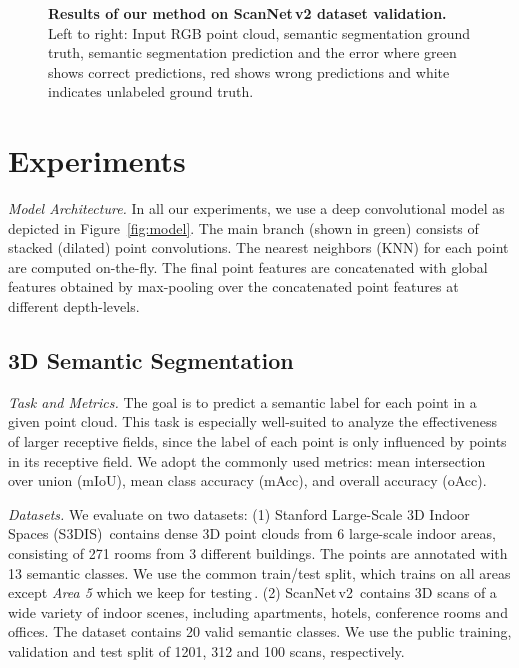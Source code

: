 \documentclass[letterpaper, 10 pt, conference]{ieeeconf}
\newcommand{\reffig}[1]{Figure~\ref{fig:#1}}
\newcommand{\parag}[1]{\vspace{0ex} \textit{#1}}
\begin{document}
\begin{figure*}[htp]
\caption{\textbf{Results of our method on ScanNet\,v2 dataset \cite{Dai17CVPR} validation.} Left to right: Input RGB point cloud, semantic segmentation ground truth, semantic segmentation prediction and the error where green shows correct predictions, red shows wrong predictions and white indicates unlabeled ground truth.}
\label{fig:scannet_quali}
\end{figure*}
 


\section{Experiments}
\label{sec:experiments}

\parag{Model Architecture.}
In all our experiments, we use a deep convolutional model as depicted in \reffig{model}.
The main branch (shown in green) consists of stacked (dilated) point convolutions.
The  nearest neighbors (KNN) for each point are computed on-the-fly.
The final point features are concatenated with global features obtained by max-pooling over the concatenated point features at different depth-levels.

\subsection{3D Semantic Segmentation}
\parag{Task and Metrics.}
The goal is to predict a semantic label for each point in a given point cloud.
This task is especially well-suited to analyze the effectiveness of larger receptive fields, since the label of each point is only influenced by points in its receptive field.
We adopt the commonly used metrics: mean intersection over union (mIoU), mean class accuracy (mAcc), and overall accuracy (oAcc).

\parag{Datasets.}
We evaluate on two datasets:
(1) Stanford Large-Scale 3D Indoor Spaces (S3DIS)\,\cite{Armeni16CVPR} contains dense 3D point clouds from 6 large-scale indoor areas, consisting of 271 rooms from 3 different buildings.
The points are annotated with 13 semantic classes.
We use the common train/test split, which trains on all areas except \emph{Area 5} which we keep for testing\,\cite{Armeni16CVPR, Tchapmi173DV, Wang18CVPRa}.
(2) {ScanNet\,v2\,\cite{Dai17CVPR}}
contains 3D scans of a wide variety of indoor scenes, including apartments, hotels, conference rooms and offices.
The dataset contains 20 valid semantic classes.
We use the public training, validation and test split of 1201, 312 and 100 scans, respectively.
\end{document}
